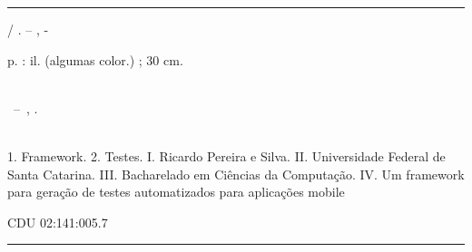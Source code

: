 \documentclass[
  12pt,       %
  openright,      %
  twoside,      %
  a4paper,      %
  english,      %
  french,       %
  spanish,      %
  brazil,       %
  ]{abntex2}
\begin{document}
\frenchspacing


\imprimircapa

\imprimirfolhaderosto*


%
%     
\begin{fichacatalografica}
  \vspace*{\fill}         %
  \hrule              %
  \begin{center}          %
  \begin{minipage}[c]{12.5cm}   %

  \imprimirautor

  \hspace{0.5cm} \imprimirtitulo  / \imprimirautor. --
  \imprimirlocal, \imprimirdata-

  \hspace{0.5cm} \pageref{LastPage} p. : il. (algumas color.) ; 30 cm.\\

  \hspace{0.5cm} \imprimirorientadorRotulo~\imprimirorientador\\

  \hspace{0.5cm}
  \parbox[t]{\textwidth}{\imprimirtipotrabalho~--~\imprimirinstituicao,
  \imprimirdata.}\\

  \hspace{0.5cm}
    1. Framework.
    2. Testes.
    I. Ricardo Pereira e Silva.
    II. Universidade Federal de Santa Catarina.
    III. Bacharelado em Ciências da Computação.
    IV. Um framework para geração de testes automatizados para aplicações mobile

  \hspace{8.75cm} CDU 02:141:005.7\\

  \end{minipage}
  \end{center}
  \hrule
\end{fichacatalografica}
\end{document}
